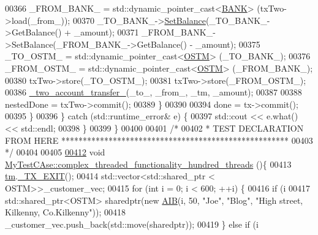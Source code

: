 \begin{DoxyCode}
00366                 \_FROM\_BANK\_ = std::dynamic\_pointer\_cast<\hyperlink{class_b_a_n_k}{BANK}> (txTwo->load(\_from\_));
00370                 \_TO\_BANK\_->\hyperlink{class_b_a_n_k_ae3e45b407bf8ec7175662442ea24b7c0_ae3e45b407bf8ec7175662442ea24b7c0}{SetBalance}(\_TO\_BANK\_->GetBalance() + \_amount);
00371                 \_FROM\_BANK\_->SetBalance(\_FROM\_BANK\_->GetBalance() - \_amount);
00375                 \_TO\_OSTM\_ = std::dynamic\_pointer\_cast<\hyperlink{class_o_s_t_m}{OSTM}> (\_TO\_BANK\_);
00376                 \_FROM\_OSTM\_ = std::dynamic\_pointer\_cast<\hyperlink{class_o_s_t_m}{OSTM}> (\_FROM\_BANK\_);
00380                 txTwo->store(\_TO\_OSTM\_);
00381                 txTwo->store(\_FROM\_OSTM\_);
00386                 \hyperlink{class_my_test_c_ase_af0cc86421d281cc4a583a394ae86dbdd_af0cc86421d281cc4a583a394ae86dbdd}{\_two\_account\_transfer\_}(\_to\_, \_from\_, \_tm, \_amount);
00387 
00388                 nestedDone = txTwo->commit();
00389             \}
00390 
00394             done = tx->commit();
00395         \}
00396     \} \textcolor{keywordflow}{catch} (std::runtime\_error& e) \{
00397         std::cout << e.what() << std::endl;
00398     \}
00399 \}
00400 
00401 \textcolor{comment}{/*}
00402 \textcolor{comment}{ * TEST DECLARATION FROM HERE *****************************************************}
00403 \textcolor{comment}{ */}
00404 
00405 
\hypertarget{_my_test_c_ase_8cpp_source.tex_l00412}{}\hyperlink{class_my_test_c_ase_a8a198d6ef96a8a07ea7fa839ad068ffb_a8a198d6ef96a8a07ea7fa839ad068ffb}{00412} \textcolor{keywordtype}{void} \hyperlink{class_my_test_c_ase_a8a198d6ef96a8a07ea7fa839ad068ffb_a8a198d6ef96a8a07ea7fa839ad068ffb}{MyTestCAse::complex\_threaded\_functionality\_hundred\_threads}
      ()\{
00413     \hyperlink{class_my_test_c_ase_a422e6e5d4ddedea384be96031c89b72b_a422e6e5d4ddedea384be96031c89b72b}{tm}.\hyperlink{class_t_m_a5e2d1127f2429f2f524d25f430eade06_a5e2d1127f2429f2f524d25f430eade06}{\_TX\_EXIT}();
00414      std::vector<std::shared\_ptr < OSTM>>\_customer\_vec; 
00415      \textcolor{keywordflow}{for} (\textcolor{keywordtype}{int} i = 0; i < 600; ++i) \{
00416         \textcolor{keywordflow}{if} (i %
00417             std::shared\_ptr<OSTM> sharedptr(\textcolor{keyword}{new} \hyperlink{class_a_i_b}{AIB}(i, 50, \textcolor{stringliteral}{"Joe"}, \textcolor{stringliteral}{"Blog"}, \textcolor{stringliteral}{"High street, Kilkenny,
       Co.Kilkenny"}));
00418             \_customer\_vec.push\_back(std::move(sharedptr));
00419         \} \textcolor{keywordflow}{else} \textcolor{keywordflow}{if} (i %

\end{DoxyCode}
